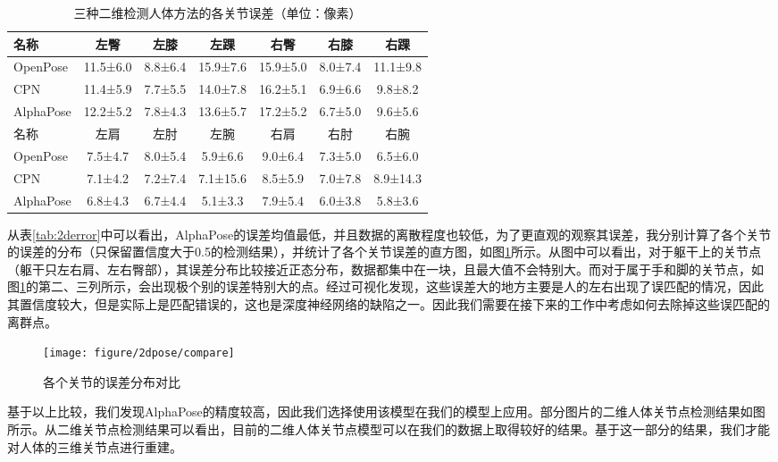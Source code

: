 \begin{table}[H]
    \centering
    \begin{tabular}{lcccccc}
        \hline
         名称      & 左臀     & 左膝    & 左踝     & 右臀     & 右膝    & 右踝     \\
        \hline
         OpenPose  & 11.5±6.0 & 8.8±6.4 & 15.9±7.6 & 15.9±5.0 & 8.0±7.4 & 11.1±9.8 \\
         CPN       & 11.4±5.9 & 7.7±5.5 & 14.0±7.8 & 16.2±5.1 & 6.9±6.6 & 9.8±8.2  \\
         AlphaPose & 12.2±5.2 & 7.8±4.3 & 13.6±5.7 & 17.2±5.2 & 6.7±5.0 & 9.6±5.6  \\
        \hline
         名称      & 左肩     & 左肘    & 左腕     & 右肩     & 右肘    & 右腕     \\
        \hline
         OpenPose  & 7.5±4.7  & 8.0±5.4 & 5.9±6.6  & 9.0±6.4  & 7.3±5.0 & 6.5±6.0  \\
         CPN       & 7.1±4.2  & 7.2±7.4 & 7.1±15.6 & 8.5±5.9  & 7.0±7.8 & 8.9±14.3 \\
         AlphaPose & 6.8±4.3  & 6.7±4.4 & 5.1±3.3  & 7.9±5.4  & 6.0±3.8 & 5.8±3.6  \\
        \hline
        \end{tabular}
    \caption{三种二维检测人体方法的各关节误差（单位：像素）\label{tab:2derrorjoint}}
\end{table}
从表\ref{tab:2derror}中可以看出，AlphaPose的误差均值最低，并且数据的离散程度也较低，为了更直观的观察其误差，我分别计算了各个关节的误差的分布（只保留置信度大于0.5的检测结果），并统计了各个关节误差的直方图，如图\ref{fig:2d-loss}所示。从图中可以看出，对于躯干上的关节点（躯干只左右肩、左右臀部），其误差分布比较接近正态分布，数据都集中在一块，且最大值不会特别大。而对于属于手和脚的关节点，如图\ref{fig:2d-loss}的第二、三列所示，会出现极个别的误差特别大的点。经过可视化发现，这些误差大的地方主要是人的左右出现了误匹配的情况，因此其置信度较大，但是实际上是匹配错误的，这也是深度神经网络的缺陷之一。因此我们需要在接下来的工作中考虑如何去除掉这些误匹配的离群点。

\begin{figure}[htbp]
    \centering
    \texttt{[image: figure/2dpose/compare]}
    \caption{\label{fig:2d-loss} 各个关节的误差分布对比}
\end{figure}

基于以上比较，我们发现AlphaPose的精度较高，因此我们选择使用该模型在我们的模型上应用。部分图片的二维人体关节点检测结果如图所示。从二维关节点检测结果可以看出，目前的二维人体关节点模型可以在我们的数据上取得较好的结果。基于这一部分的结果，我们才能对人体的三维关节点进行重建。

